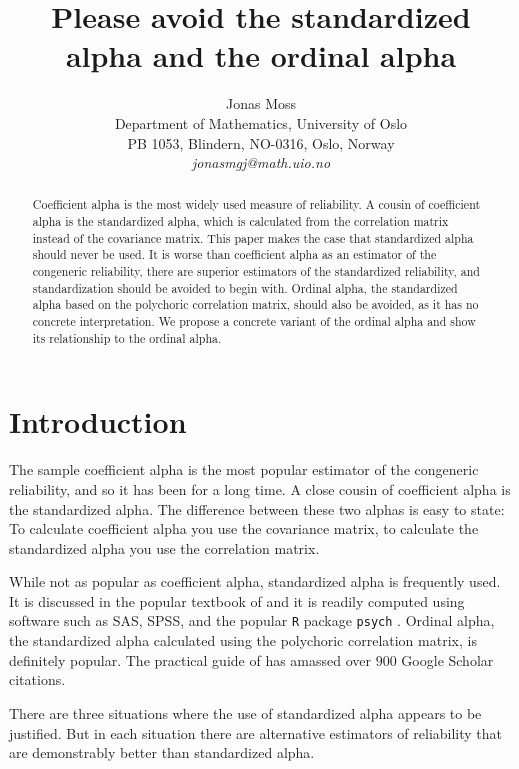\documentclass[twoside]{article}
\title{Please avoid the standardized alpha and the ordinal alpha}
\author{
  Jonas Moss \orcid{0000-0002-6876-6964} \\
  Department of Mathematics, University of Oslo\\
  PB 1053, Blindern, NO-0316, Oslo, Norway \\
  \it{jonasmgj@math.uio.no}
}
\begin{document}
\maketitle

\begin{abstract}
Coefficient alpha is the most widely used measure of reliability. A cousin of coefficient alpha is the standardized alpha, which is calculated from the correlation matrix instead of the covariance matrix. This paper makes the case that standardized alpha should never be used. It is worse than coefficient alpha as an estimator of the congeneric reliability, there are superior estimators of the standardized reliability, and standardization should be avoided to begin with. Ordinal alpha, the standardized alpha based on the polychoric correlation matrix, should also be avoided, as it has no concrete interpretation. We propose a concrete variant of the ordinal alpha and show its relationship to the ordinal alpha.
\end{abstract}


\section{Introduction}

The sample coefficient alpha is the most popular estimator of the congeneric reliability, and so it has been for a long time. A close cousin of coefficient alpha is the standardized alpha. The difference between these two alphas is easy to state: To calculate coefficient alpha you use the covariance matrix, to calculate the standardized alpha you use the correlation matrix. 

While not as popular as coefficient alpha, standardized alpha is frequently used. It is discussed in the popular textbook of \citet[pp. 139--141]{Furr2013-yu} and it is readily computed using software such as SAS, SPSS, and the popular \texttt{R} \citep{Team2013-tt} package \texttt{psych} \citep{psych}. Ordinal alpha, the standardized alpha calculated using the polychoric correlation matrix, is definitely popular. The practical guide of \citet{Gadermann2012-jl} has amassed over $900$ Google Scholar citations.

There are three situations where the use of standardized alpha appears to be justified. But in each situation there are alternative estimators of reliability that are demonstrably better than standardized alpha. 
\end{document}
